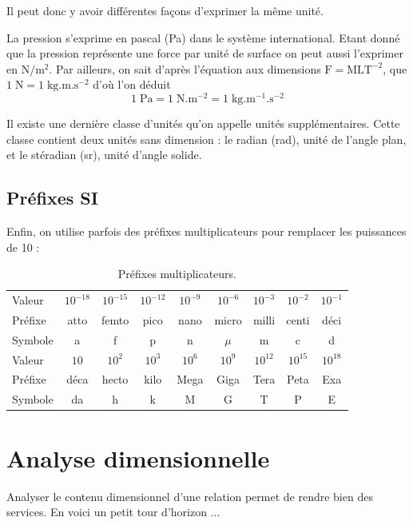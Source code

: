 Il peut donc y avoir différentes façons d'exprimer la même unité.	

\begin{kaoexample}[frametitle=Exemple : unités de la pression]
La pression s'exprime en pascal (Pa) dans le système international. Etant donné que la pression représente une force par unité de surface on peut aussi l'exprimer en $\mathrm{N/m^2}$. Par ailleurs, on sait d'après l'équation aux dimensions $\mathrm{F=MLT^{-2}}$, que $1\;\mathrm{N}=1\;\mathrm{kg.m.s^{-2}}$ d'où l'on déduit 
\[
1\;\mathrm{Pa}=1\;\mathrm{N.m^{-2}}=1\;\mathrm{kg.m^{-1}.s^{-2}}
\]
\end{kaoexample} 
 
\begin{kaoremark}
Il existe une dernière classe d'unités qu'on appelle unités supplémentaires. Cette classe contient deux unités sans dimension : le radian (rad), unité de l'angle plan, et le stéradian (sr), unité d'angle solide.
\end{kaoremark} 


\subsection{Préfixes SI}	
Enfin, on utilise parfois des préfixes multiplicateurs pour remplacer les puissances de 10 : 
\begin{table}[h!tbp]
	\caption{Préfixes multiplicateurs.}
	\footnotesize
\begin{tabular}{lcccccccc}
\toprule
Valeur &	$10^{-18}$ &	$10^{-15}$ &	$10^{-12}$ &	$10^{-9}$ &	$10^{-6}$ &	$10^{-3}$ &	$10^{-2}$ &	$10^{-1}$ \\
Préfixe &	atto &	femto &	pico &	nano &	micro &	milli &centi & déci \\
Symbole	& a	& f	& p	& n	& $\mu$	& m & c & d	\\
\midrule
\midrule
Valeur &	$10$	& $10^{2}$	& $10^{3}$	& $10^{6}$	& $10^{9}$	& $10^{12}$	& $10^{15}$	& $10^{18}$ \\
Préfixe &	déca	& hecto		& kilo 		& Mega		& Giga 		& Tera 		& Peta 		&	Exa \\
Symbole	& da& h	& k	& M	& G	& T	& P &	E \\
\bottomrule
\end{tabular}
\end{table}

\section{Analyse dimensionnelle}
Analyser le contenu dimensionnel d'une relation permet de rendre bien des services. En voici un petit tour d'horizon ...
